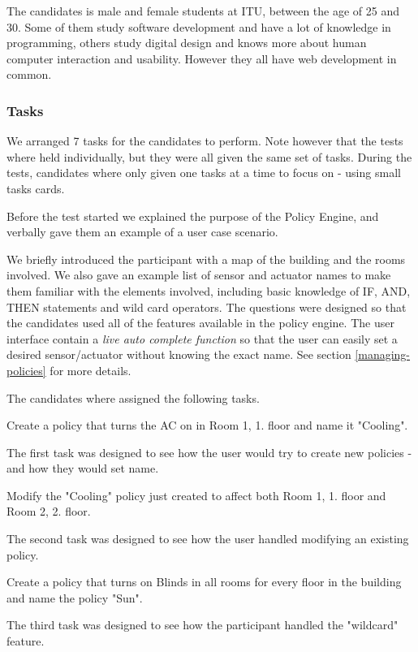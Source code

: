 The candidates is male and female students at ITU, between the age of 25 and 30. Some of them study software development and have a lot of knowledge in programming, others study digital design and knows more about human computer interaction and usability. However they all have web development in common.

\subsubsection{Tasks}
We arranged 7 tasks for the candidates to perform. Note however that the tests where held individually, but they were all given the same set of tasks. 
During the tests, candidates where only given one tasks at a time to focus on - using small tasks cards.

Before the test started we explained the purpose of the Policy Engine, and verbally gave them an example of a user case scenario.

We briefly introduced the participant with a map of the building and the rooms involved. We also gave an example list of sensor and actuator names to make them familiar with the elements involved, including basic knowledge of IF, AND, THEN statements and wild card operators. The questions were designed so that the candidates used all of the features available in the policy engine. The user interface contain a \textit{live auto complete function} so that the user can easily set a desired sensor/actuator without knowing the exact name. See section \ref{managing-policies} for more details.

The candidates where assigned the following tasks. 

\begin{framed}
Create a policy that turns the AC on in Room 1, 1. floor and name it "Cooling".
\end{framed}
The first task was designed to see how the user would try to create new policies - and how they would set name.

\begin{framed}
Modify the "Cooling" policy just created to affect both Room 1, 1. floor and Room 2, 2. floor.
\end{framed}
The second task was designed to see how the user handled modifying an existing policy.

\begin{framed}
Create a policy that turns on Blinds in all rooms for every floor in the building and name the policy "Sun".
\end{framed}
The third task was designed to see how the participant handled the "wildcard" feature.

